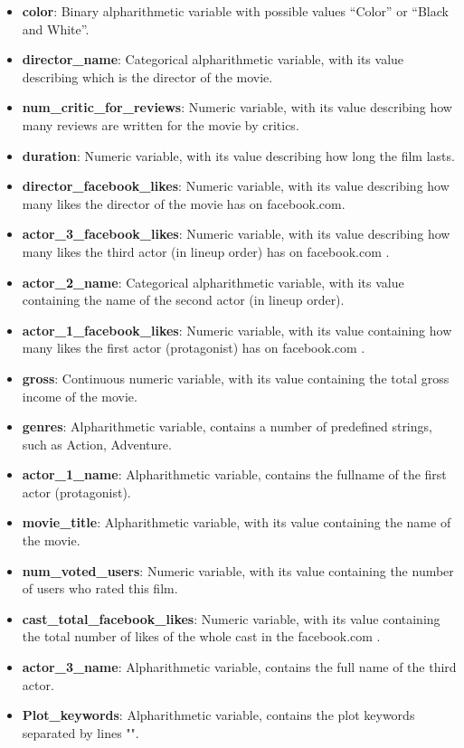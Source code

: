 \documentclass[letterpaper,twocolumn,10pt]{article}
\begin{document}
\begin{itemize}
\item \textbf{color}: Binary alpharithmetic variable with possible values “Color” or “Black and White”.
\item \textbf{director\_name}: Categorical alpharithmetic variable, with its value describing which is the director of the movie.
\item \textbf{num\_critic\_for\_reviews}: Numeric variable, with its value describing how many reviews are written for the movie by critics.
\item \textbf{duration}: Numeric variable, with its value describing how long the film lasts.
\item \textbf{director\_facebook\_likes}: Numeric variable, with its value describing how many likes the director of the movie has on facebook.com.
\item \textbf{actor\_3\_facebook\_likes}: Numeric variable, with its value describing how many likes the third actor (in lineup order) has on facebook.com .
\item \textbf{actor\_2\_name}: Categorical alpharithmetic variable, with its value containing the name of the second actor (in lineup order).
\item \textbf{actor\_1\_facebook\_likes}: Numeric variable, with its value containing how many likes the first actor (protagonist) has on facebook.com .
\item \textbf{gross}: Continuous numeric variable, with its value containing the total gross income of the movie.
\item \textbf{genres}: Alpharithmetic variable, contains a number of predefined strings, such as Action, Adventure.
\item \textbf{actor\_1\_name}: Alpharithmetic variable, contains the fullname of the first actor (protagonist).
\item \textbf{movie\_title}: Alpharithmetic variable, with its value containing the name of the movie.
\item \textbf{num\_voted\_users}: Numeric variable, with its value containing the number of users who rated this film.
\item \textbf{cast\_total\_facebook\_likes}: Numeric variable, with its value containing the total number of likes of the whole cast in the facebook.com .
\item \textbf{actor\_3\_name}: Alpharithmetic variable, contains the full name of the third actor.
\item \textbf{Plot\_keywords}: Alpharithmetic variable, contains the plot keywords separated by lines "\textbar".

\end{itemize}
\end{document}
